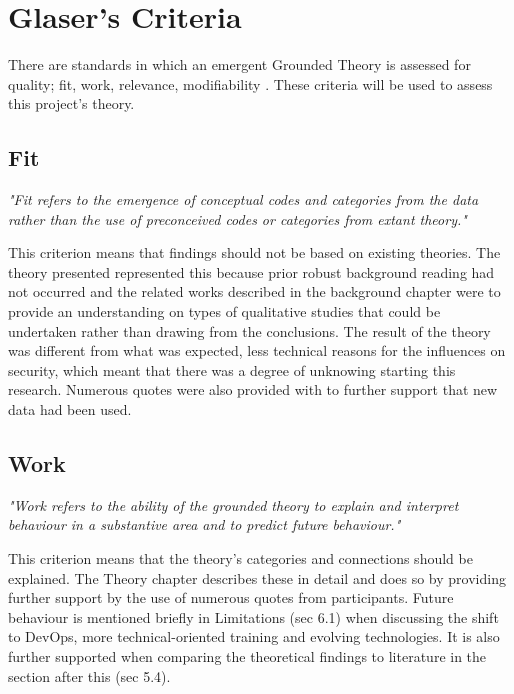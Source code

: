 \section{Glaser's Criteria}

There are standards in which an emergent Grounded Theory is assessed for quality; fit, work, relevance, modifiability \cite{crit}. These criteria will be used to assess this project's theory. 

\subsection{Fit}

\textit{"Fit refers to the emergence of conceptual codes and categories from the data rather than the use of preconceived codes or categories from extant theory." \cite{crit}}
\newline
\par 
This criterion means that findings should not be based on existing theories. The theory presented represented this because prior robust background reading had not occurred and the related works described in the background chapter were to provide an understanding on types of qualitative studies that could be undertaken rather than drawing from the conclusions. The result of the theory was different from what was expected, less technical reasons for the influences on security, which meant that there was a degree of unknowing starting this research. Numerous quotes were also provided with to further support that new data had been used. 

\subsection{Work}

\textit{"Work refers to the ability of the grounded theory to explain and interpret behaviour in a substantive area and to predict future behaviour." \cite{crit}}
\newline
\par 
This criterion means that the theory's categories and connections should be explained. The Theory chapter describes these in detail and does so by providing further support by the use of numerous quotes from participants. Future behaviour is mentioned briefly in Limitations (sec 6.1) when discussing the shift to DevOps, more technical-oriented training and evolving technologies. It is also further supported when comparing the theoretical findings to literature in the section after this (sec 5.4).

